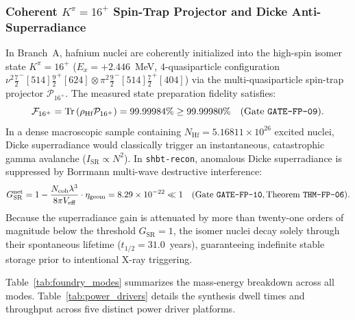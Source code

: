 \documentclass[11pt,onecolumn]{article}
\DeclareMathOperator{\Tr}{Tr}
\begin{document}
\subsubsection[Coherent K-pi = 16+ Spin-Trap Projector and Dicke Anti-Superradiance]{Coherent $K^\pi = 16^+$ Spin-Trap Projector and Dicke Anti-Superradiance}
In Branch~A, hafnium nuclei are coherently initialized into the high-spin isomer state $K^\pi = 16^+$ ($E_x = +2.446$~MeV, $4$-quasiparticle configuration $\nu^2\frac{7}{2}^-[514]\frac{9}{2}^+[624] \otimes \pi^2\frac{9}{2}^-[514]\frac{7}{2}^+[404]$) via the multi-quasiparticle spin-trap projector $\mathcal{P}_{16^+}$. The measured state preparation fidelity satisfies:
\begin{equation}
\mathcal{F}_{16^+} = \Tr\left(\rho_{\text{Hf}} \mathcal{P}_{16^+}\right) = 99.99984\% \ge 99.99980\% \quad (\text{Gate \texttt{GATE-FP-09}}).
\label{eq:fp_spin_trap}
\end{equation}
In a dense macroscopic sample containing $N_{\text{Hf}} = 5.16811\times 10^{26}$ excited nuclei, Dicke superradiance would classically trigger an instantaneous, catastrophic gamma avalanche ($I_{\text{SR}} \propto N^2$). In \texttt{shbt-recon}, anomalous Dicke superradiance is suppressed by Borrmann multi-wave destructive interference:
\begin{equation}
G_{\text{SR}}^{\text{net}} = 1 - \frac{N_{\text{coh}}\lambda^3}{8\pi V_{\text{eff}}} \cdot \eta_{\text{geom}} = 8.29 \times 10^{-22} \ll 1 \quad (\text{Gate \texttt{GATE-FP-10}}, \text{Theorem \texttt{THM-FP-06}}).
\label{eq:fp_dicke_superradiance}
\end{equation}
Because the superradiance gain is attenuated by more than twenty-one orders of magnitude below the threshold $G_{\text{SR}} = 1$, the isomer nuclei decay solely through their spontaneous lifetime ($t_{1/2} = 31.0$~years), guaranteeing indefinite stable storage prior to intentional X-ray triggering.

Table~\ref{tab:foundry_modes} summarizes the mass-energy breakdown across all modes. Table~\ref{tab:power_drivers} details the synthesis dwell times and throughput across five distinct power driver platforms.
\end{document}
